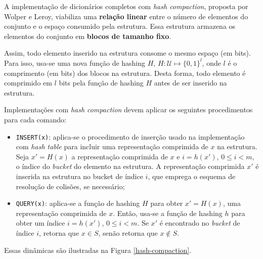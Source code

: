 \documentclass[12pt,twoside,english,brazilian]{article}
\begin{document}
A implementação de dicionários completos com \textit{hash compaction}, proposta por Wolper e Leroy, viabiliza uma \textbf{relação linear} entre o número de elementos do conjunto e o espaço consumido pela estrutura. Essa estrutura armazena os elementos do conjunto em \textbf{blocos de tamanho fixo}.

Assim, todo elemento inserido na estrutura consome o mesmo espaço (em bits). Para isso, usa-se uma nova função de hashing $H$, $H: \mathcal{U} \mapsto \{0, 1\}^l$, onde $l$ é o comprimento (em bits) dos blocos na estrutura. Desta forma, todo elemento é comprimido em $l$ bits pela função de hashing $H$ antes de ser inserido na estrutura.

Implementações com \textit{hash compaction} devem aplicar os seguintes procedimentos para cada comando:

\begin{itemize}
    \item \texttt{INSERT(x)}: aplica-se o procedimento de inserção usado na implementação com \textit{hash table} para incluir uma representação comprimida de $x$ na estrutura. Seja $x' = H(x)$ a representação comprimida de $x$ e $i = h(x')$, $0 \leq i < m$, o índice do \textit{bucket} do elemento na estrutura. A representação comprimida $x'$ é inserida na estrutura no bucket de índice $i$, que emprega o esquema de resolução de colisões, se necessário;
    \item \texttt{QUERY(x)}: aplica-se a função de hashing $H$ para obter $x' = H(x)$, uma representação comprimida de $x$. Então, usa-se a função de hashing $h$ para obter um índice $i = h(x')$, $0 \leq i < m$. Se $x'$ é encontrado no \textit{bucket} de índice $i$, retorna que $x \in S$, senão retorna que $x \notin S$.
\end{itemize}

Essas dinâmicas são ilustradas na Figura \ref{hash-compaction}.
\end{document}
